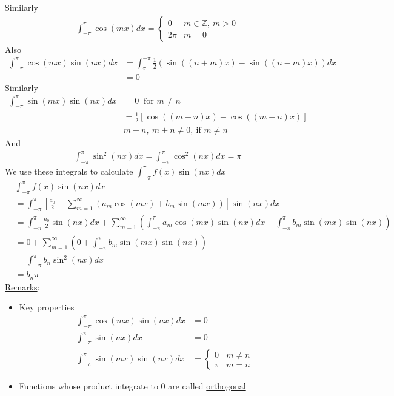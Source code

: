 \documentclass[12pt, letterpaper]{article}
\begin{document}
Similarly
\begin{align*}
    \int_{-\pi}^{\pi} \cos(mx)dx = \begin{cases}
        0 & m \in \mathbb{Z},\ m > 0 \\
        2\pi & m = 0
    \end{cases}
\end{align*}
Also 
\begin{align*}
    \int_{-\pi}^{\pi} \cos(mx)\sin(nx) dx &= \int_{\pi}^{-\pi} \frac{1}{2} (\sin((n+m)x)-\sin((n-m)x))dx \\
    &= 0
\end{align*}
Similarly
\begin{align*}
    \int_{-\pi}^{\pi} \sin(mx)\sin(nx)dx &= 0 \ \text{ for } m\ne n\\
    &= \frac 12 [\cos((m-n)x) - \cos((m+n)x)] \\
    & m-n,\ m+n \ne 0,\ \text{if } m\ne n
\end{align*}
And 
\begin{align*}
    \int_{-\pi}^{\pi} \sin^2(nx)dx = \int_{-\pi}^{\pi} \cos^2(nx)dx = \pi
\end{align*}
We use these integrals to calculate $\int_{-\pi}^{\pi} f(x) \sin(nx)dx$
\begin{align*}
    &\int_{-\pi}^{\pi}f(x) \sin(nx)dx \\
    &= \int_{-\pi}^{\pi} \left[\frac{a_0}{2} + \sum_{m=1}^{\infty} (a_m \cos(mx) + b_m \sin(mx))\right]\sin(nx)dx \\
    &= \int_{-\pi}^{\pi} \frac{a_0}{2}\sin(nx)dx + \sum_{m=1}^{\infty} \left(\int_{-\pi}^{\pi}a_m \cos(mx)\sin(nx)dx + \int_{-\pi}^{\pi}b_m \sin(mx)\sin(nx)\right) \\
    &= 0 + \sum_{m=1}^{\infty} \left(0 + \int_{-\pi}^{\pi}b_m \sin(mx)\sin(nx)\right) \\
    &= \int_{-\pi}^{\pi} b_n\sin^2(nx) dx \\
    &= b_n \pi
\end{align*}
\underline{Remarks}:
\begin{itemize}
    \item Key properties
    \begin{align*}
        \int_{-\pi}^{\pi} \cos(mx)\sin(nx)dx &= 0 \\
        \int_{-\pi}^{\pi} \sin(nx)dx &= 0\\
        \int_{-\pi}^{\pi} \sin(mx)\sin(nx)dx &= \begin{cases}
            0 & m\ne n \\
            \pi & m = n
        \end{cases}
    \end{align*}
    \item Functions whose product integrate to 0 are called \underline{orthogonal}
\end{itemize}
\end{document}
